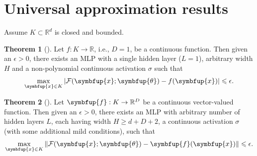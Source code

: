 \documentclass[11pt]{extarticle}
\newcommand{\vf}{\symbfup{f}}
\newcommand{\vx}{\symbfup{x}}
\theoremstyle{definition}
\newcommand{\btheta}{\symbfup{\theta}}
\newcommand{\Ro}{\mathbb{R}}           	                %
\newtheorem{theorem}{Theorem}%
\begin{document}
%
\section*{Universal approximation results}\label{sec:uni_app_thms}
Assume $K \subset \Ro^d$ is closed and bounded.

\begin{theorem}[\cite{Pinkus1999}]
Let $f:K\to\Ro$, i.e., $D=1$, be a continuous function. Then given an $\epsilon > 0$, there exists an MLP with a single hidden layer ($L=1$), arbitrary width $H$ and a non-polynomial continuous activation $\sigma$ such that
\begin{align*}
  \max_{\vx \in K} |\mathcal{F}(\vx;\btheta) - f(\vx)| \leqslant \epsilon.
\end{align*} 
\end{theorem}

\begin{theorem}[\cite{Kidger2020}]
Let $\vf:K \to \Ro^D$ be a continuous vector-valued function. Then given an $\epsilon >0$, there exists an MLP with arbitrary number of hidden layers $L$, each having width $H \geqslant d + D + 2$, a continuous activation $\sigma$ (with some additional mild conditions), such that
\begin{align*}
\max_{\vx \in K}  \|\mathcal{F}(\vx;\btheta) - \vf(\vx)\| \leqslant \epsilon.
\end{align*} 
\end{theorem}
\end{document}
